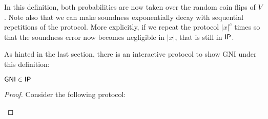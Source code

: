 \documentclass{article}
\begin{document}
In this definition, both probabilities are now taken over the random coin flips of $V$.
Note also that we can make soundness exponentially decay with
sequential repetitions of the protocol. More explicitly, if we repeat the protocol $|x|^c$ times so that the soundness error now becomes negligible in $|x|$, that is still in $\mathsf{IP}$.

As hinted in the last section, there is an interactive protocol to show GNI under this definition:

\begin{theorem}[GMW85]
    $\textnormal{\textsf{GNI}} \in \mathsf{IP}$
\end{theorem}
\begin{proof}
Consider the following protocol:
    \begin{center}
\end{center}

\end{proof}
\end{document}
